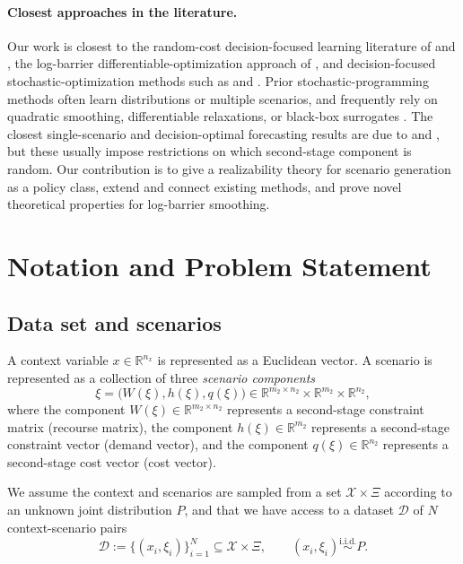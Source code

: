 \documentclass{article}
\newcommand{\R}{\mathbb{R}}
\newcommand{\1}{\mathbf{1}}
\theoremstyle{plain}
\theoremstyle{definition}
\theoremstyle{remark}
\begin{document}
\paragraph{Closest approaches in the literature.}
Our work is closest to the random-cost decision-focused learning literature of \citet{elmachtoub2022smart} and \citet{wilder2019melding}, the log-barrier differentiable-optimization approach of \citet{mandi2020interior}, and decision-focused stochastic-optimization methods such as \citet{donti2017task} and \citet{islip2025contextual}. Prior stochastic-programming methods often learn distributions or multiple scenarios, and frequently rely on quadratic smoothing, differentiable relaxations, or black-box surrogates \citep{donti2017task,agrawal2019differentiable,islip2025contextual}. The closest single-scenario and decision-optimal forecasting results are due to \citet{estes2023smart} and \citet{homemdemello2024forecasting}, but these usually impose restrictions on which second-stage component is random. Our contribution is to give a realizability theory for scenario generation as a policy class, extend and connect existing methods, and prove novel theoretical properties for log-barrier smoothing.

\section{Notation and Problem Statement}
\label{sec:notation-problem}
\label{sec:problem}

\subsection{Data set and scenarios}
\label{sec:data-scenarios}

A context variable $x\in \R^{n_x}$ is represented as a Euclidean vector. A scenario is represented as a collection of three \emph{scenario components}
\[
\xi=\bigl(W(\xi),h(\xi),q(\xi)\bigr)
\in \R^{m_2\times n_2}\times\R^{m_2}\times\R^{n_2},
\]
where the component $W(\xi)\in \R^{m_2\times n_2}$ represents a second-stage constraint matrix (recourse matrix), the component $h(\xi)\in \R^{m_2}$ represents a second-stage constraint vector (demand vector), and the component $q(\xi)\in \R^{n_2}$ represents a second-stage cost vector (cost vector).

We assume the context and scenarios are sampled from a set $\mathcal X \times \Xi$ according to an unknown joint distribution $P$, and that we have access to a dataset $\mathcal D$ of $N$ context-scenario pairs
\begin{equation}
\label{eq:dataset}
\mathcal D:=\{(x_i,\xi_i)\}_{i=1}^N\subseteq \mathcal X\times \Xi,
\qquad
(x_i,\xi_i)\overset{\mathrm{i.i.d.}}{\sim}P.
\end{equation}
\end{document}
